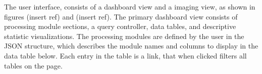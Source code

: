 The user interface, consists of a dashboard view and a imaging view, as shown in figures (insert ref) and (insert ref). The primary dashboard view consists of processing module sections, a query controller, data tables, and descriptive statistic visualizations. The processing modules are defined by the user in the JSON structure, which describes the module names and columns to display in the data table below. Each entry in the table is a link, that when clicked filters all tables on the page. 